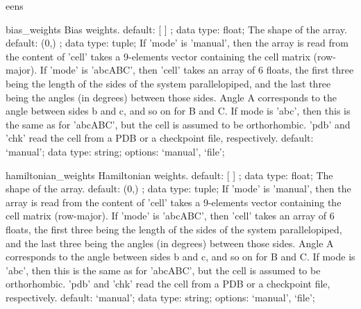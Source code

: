 \begin{ipifield}{}
\begin{ipifield}{eens}
{}
\end{ipifield}
\begin{ipifield}{bias\_weights}%
{Bias weights.}%
{default:  [ ] ; data type: float; }%
{%
{The shape of the array.}%
{default:  (0,) ; data type: tuple; }%
%
{If 'mode' is 'manual', then the array is read from the content of 'cell' takes a 9-elements vector containing the cell matrix (row-major). If 'mode' is 'abcABC', then 'cell' takes an array of 6 floats, the first three being the length of the sides of the system parallelopiped, and the last three being the angles (in degrees) between those sides. Angle A corresponds to the angle between sides b and c, and so on for B and C. If mode is 'abc', then this is the same as for 'abcABC', but the cell is assumed to be orthorhombic. 'pdb' and 'chk' read the cell from a PDB or a checkpoint file, respectively.}%
{default: `manual'; data type: string; options: `manual', `file'; }%
}
\end{ipifield}
\begin{ipifield}{hamiltonian\_weights}%
{Hamiltonian weights.}%
{default:  [ ] ; data type: float; }%
{%
{The shape of the array.}%
{default:  (0,) ; data type: tuple; }%
%
{If 'mode' is 'manual', then the array is read from the content of 'cell' takes a 9-elements vector containing the cell matrix (row-major). If 'mode' is 'abcABC', then 'cell' takes an array of 6 floats, the first three being the length of the sides of the system parallelopiped, and the last three being the angles (in degrees) between those sides. Angle A corresponds to the angle between sides b and c, and so on for B and C. If mode is 'abc', then this is the same as for 'abcABC', but the cell is assumed to be orthorhombic. 'pdb' and 'chk' read the cell from a PDB or a checkpoint file, respectively.}%
{default: `manual'; data type: string; options: `manual', `file'; }%
}
\end{ipifield}
\end{ipifield}
